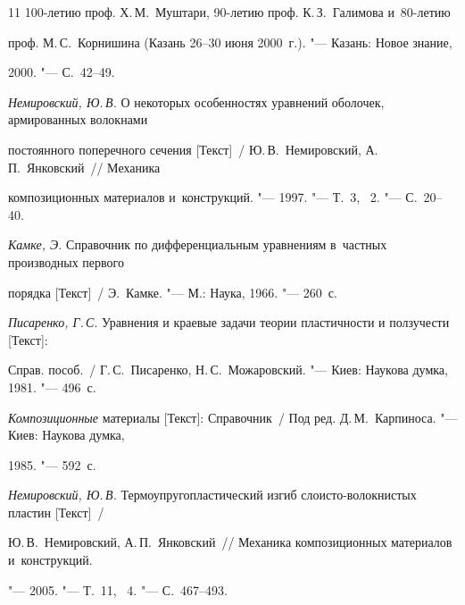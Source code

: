 \begin{thebibliography}{11}
100-летию проф. Х.\,М.~Муштари, 90-летию проф. К.\,З.~Галимова и~80-летию 

проф. М.\,С.~Корнишина (Казань 26--30 июня 2000~г.). "--- Казань: Новое знание, 

2000. "--- С.~42--49.



\item 

\textit{Немировский, Ю.\,В.} О некоторых особенностях уравнений оболочек, армированных волокнами 

постоянного поперечного сечения [Текст]~/ Ю.\,В.~Немировский, А.\,П.~Янковский~/\!/ Механика 

композиционных материалов и~конструкций. "--- 1997. "--- Т.~3, \No~2. "--- С.~20--40.



\item 

\textit{Камке, Э.} Справочник по дифференциальным уравнениям в~частных производных первого 

порядка [Текст]~/ Э.~Камке. "--- М.: Наука, 1966. "--- 260~с.



\item 

\textit{Писаренко, Г.\,С}. Уравнения и краевые задачи теории пластичности и ползучести [Текст]:

 Справ. пособ.~/ Г.\,С.~Писаренко, Н.\,С.~Можаровский. "--- Киев: Наукова думка, 1981. "--- 496~с.



\item 

\textit{Композиционные} материалы [Текст]: Справочник~/ Под ред. Д.\,М.~Карпиноса. "--- Киев: Наукова думка, 

1985. "--- 592~с.



\item 

\textit{Немировский, Ю.\,В.} Термоупругопластический изгиб слоисто-волокнистых пластин \linebreak{} [Текст]~/ 

Ю.\,В.~Немировский, А.\,П.~Янковский~/\!/ Механика композиционных материалов и~конструкций. 

"--- 2005. "--- Т.~11, \No~4. "--- С.~467--493. 

\end{thebibliography}



\makeengtitle












